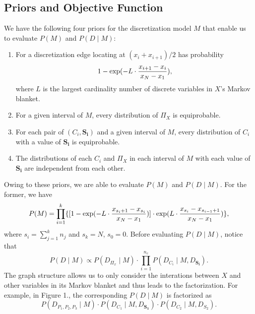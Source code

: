 

\subsection{Priors and Objective Function}

We have the following four priors for the discretization model $M$ that enable us to evaluate $P(M)$ and $P(D \mid M)$:\\
\begin{enumerate}
\item For a discretization edge locating at $(x_i + x_{i+1})/2$ has probability
\begin{equation}
1 - {\exp(- L \cdot {{x_{i+1} - x_i}\over{x_N - x_1}})},
\end{equation}
where $L$ is the largest cardinality number of discrete variables in $X$'s Markov blanket.
\item For a given interval of $M$, every distribution of $\Pi_X$ is equiprobable.
\item For each pair of $(C_i,\boldsymbol{S_i})$ and a given interval of $M$, every distribution of $C_i$ with a value of $\boldsymbol{S_i}$ is equiprobable.
\item The distributions of each $C_i$ and $\Pi_X$ in each interval of $M$ with each value of $\boldsymbol{S_i}$ are independent from each other.
\end{enumerate}

Owing to these priors, we are able to evaluate $P(M)$ and $P(D \mid M)$. For the former, we have
\begin{equation}
P(M) = \prod_{i=1}^k \{ [1 - {\exp(- L \cdot {{x_{s_i+1} - x_{s_i}}\over{x_N - x_1}})}] \cdot \exp(L \cdot {{x_{s_{i}} - x_{s_{i-1} + 1}}\over{x_N - x_1}}) \},
\end{equation}
where $s_i = \sum_{j=1}^k n_j$ and $s_k = N$, $s_0 = 0$. Before evaluating $P(D \mid M)$, notice that
\begin{equation}
P(D \mid M) \propto P(D_{\Pi_x} \mid M) \cdot \prod_{i = 1}^{n_c} P(D_{C_i} \mid M, D_{\boldsymbol{S_i}}).
\end{equation}
The graph structure allows us to only consider the interations between $X$ and other variables in its Markov blanket and thus leads to the factorization. For example, in Figure 1., the corresponding $P(D \mid M)$ is factorized as
\begin{equation}
P(D_{ P_1,P_2,P_3 } \mid M) \cdot P( D_{ C_1 } \mid M,D_{\boldsymbol{S_1}}) \cdot P(D_{C_2} \mid M,D_{ S_2  }).
\end{equation}

